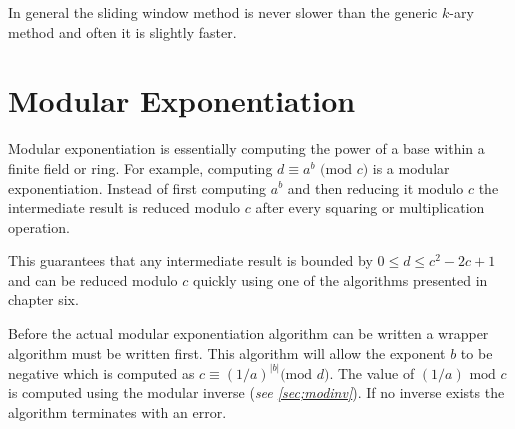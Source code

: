 \documentclass[b5paper]{book}
\begin{document}
In general the sliding window method is never slower than the generic $k$-ary method and often it is slightly faster.  

\section{Modular Exponentiation}

Modular exponentiation is essentially computing the power of a base within a finite field or ring.  For example, computing 
$d \equiv a^b \mbox{ (mod }c\mbox{)}$ is a modular exponentiation.  Instead of first computing $a^b$ and then reducing it 
modulo $c$ the intermediate result is reduced modulo $c$ after every squaring or multiplication operation.  

This guarantees that any intermediate result is bounded by $0 \le d \le c^2 - 2c + 1$ and can be reduced modulo $c$ quickly using
one of the algorithms presented in chapter six.  

Before the actual modular exponentiation algorithm can be written a wrapper algorithm must be written first.  This algorithm
will allow the exponent $b$ to be negative which is computed as $c \equiv \left (1 / a \right )^{\vert b \vert} \mbox{(mod }d\mbox{)}$. The
value of $(1/a) \mbox{ mod }c$ is computed using the modular inverse (\textit{see \ref{sec;modinv}}).  If no inverse exists the algorithm
terminates with an error.  
\end{document}
